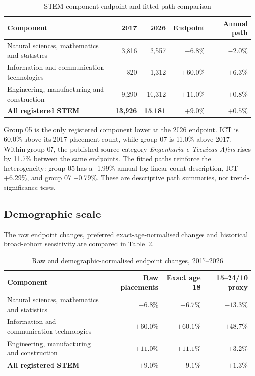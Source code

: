 \documentclass[11pt,a4paper]{article}
\begin{document}
\begin{table}[htbp]
\centering
\caption{STEM component endpoint and fitted-path comparison}\label{tab:components}
\begin{tabular}{lrrrr}
\toprule
Component & 2017 & 2026 & Endpoint & Annual path \\
\midrule
Natural sciences, mathematics and statistics & 3,816 & 3,557 & $-6.8\%$ & $-2.0\%$ \\
Information and communication technologies & 820 & 1,312 & $+60.0\%$ & $+6.3\%$ \\
Engineering, manufacturing and construction & 9,290 & 10,312 & $+11.0\%$ & $+0.8\%$ \\
\textbf{All registered STEM} & \textbf{13,926} & \textbf{15,181} & \textbf{$+9.0\%$} & \textbf{$+0.5\%$} \\
\bottomrule
\end{tabular}
\end{table}

Group 05 is the only registered component lower at the 2026 endpoint. ICT is 60.0\% above its 2017 placement count, while group 07 is 11.0\% above 2017. Within group 07, the published source category \emph{Engenharia e Tecnicas Afins} rises by 11.7\% between the same endpoints. The fitted paths reinforce the heterogeneity: group 05 has a -1.99\% annual log-linear count description, ICT +6.29\%, and group 07 +0.79\%. These are descriptive path summaries, not trend-significance tests.

\subsection{Demographic scale}
The raw endpoint changes, preferred exact-age-normalised changes and historical broad-cohort sensitivity are compared in Table~\ref{tab:demography}.

\begin{table}[htbp]
\centering
\caption{Raw and demographic-normalised endpoint changes, 2017--2026}\label{tab:demography}
\begin{tabular}{lrrr}
\toprule
Component & Raw placements & Exact age 18 & 15--24/10 proxy \\
\midrule
Natural sciences, mathematics and statistics & $-6.8\%$ & $-6.7\%$ & $-13.3\%$ \\
Information and communication technologies & $+60.0\%$ & $+60.1\%$ & $+48.7\%$ \\
Engineering, manufacturing and construction & $+11.0\%$ & $+11.1\%$ & $+3.2\%$ \\
\textbf{All registered STEM} & \textbf{$+9.0\%$} & \textbf{$+9.1\%$} & \textbf{$+1.3\%$} \\
\bottomrule
\end{tabular}
\end{table}
\end{document}
